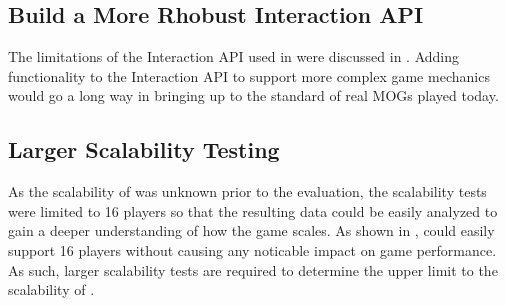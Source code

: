 \subsection{Build a More Rhobust Interaction API}
The limitations of the Interaction API used in \game{} were discussed in . Adding functionality to the Interaction API to support more complex game mechanics would go a long way in bringing \game{} up to the standard of real MOGs played today.

\subsection{Larger Scalability Testing}
As the scalability of \game{} was unknown prior to the evaluation, the scalability tests were limited to 16 players so that the resulting data could be easily analyzed to gain a deeper understanding of how the game scales. As shown in , \game{} could easily support 16 players without causing any noticable impact on game performance. As such, larger scalability tests are required to determine the upper limit to the scalability of \game{}. 